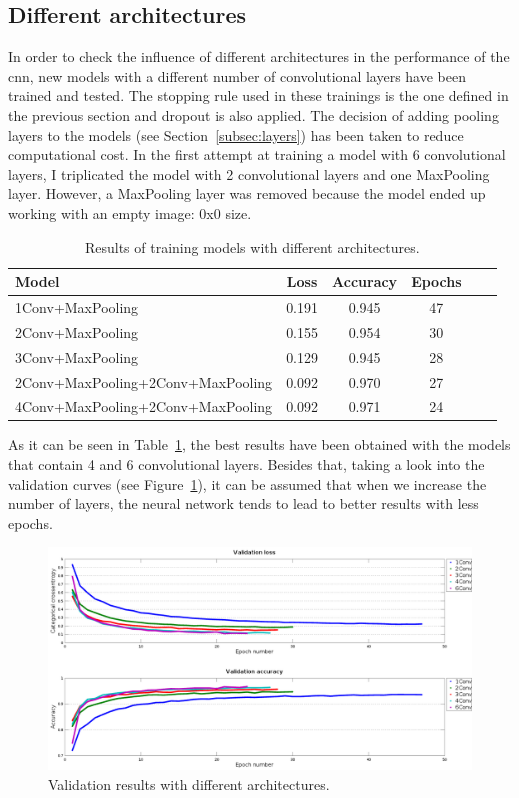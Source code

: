 \subsection{Different architectures}\label{subsec:arch}
In order to check the influence of different architectures in the performance of the \gls{cnn}, new models with a different number of convolutional layers have been trained and tested. The stopping rule used in these trainings is the one defined in the previous section and dropout is also applied. The decision of adding pooling layers to the models (see Section~\ref{subsec:layers}) has been taken to reduce computational cost. In the first attempt at training a model with 6 convolutional layers, I triplicated the model with 2 convolutional layers and one MaxPooling layer. However, a MaxPooling layer was removed because the model ended up working with an empty image: 0x0 size.
\begin{table}
	\centering
	\begin{tabular}{l*{4}{c}r}
		\textbf{Model} & \textbf{Loss} & \textbf{Accuracy} & \textbf{Epochs} \\
		\hline
		1Conv+MaxPooling & 0.191 & 0.945 & 47 \\
		2Conv+MaxPooling & 0.155 & 0.954 & 30 \\
		3Conv+MaxPooling & 0.129 & 0.945 & 28 \\
		2Conv+MaxPooling+2Conv+MaxPooling & 0.092 & 0.970 & 27 \\
		4Conv+MaxPooling+2Conv+MaxPooling & 0.092 & 0.971 & 24 \\
	\end{tabular}
	\caption{Results of training models with different architectures.}
	\label{tbl:arch}
\end{table}

As it can be seen in Table~\ref{tbl:arch}, the best results have been obtained with the models that contain 4 and 6 convolutional layers. Besides that, taking a look into the validation curves (see Figure~\ref{fig:comp_arch}), it can be assumed that when we increase the number of layers, the neural network tends to lead to better results with less epochs.

\begin{figure}
	\centering
	\includegraphics[width=1\linewidth, keepaspectratio]{figures/full_comparison.png}
	\caption{Validation results with different architectures.}
	\label{fig:comp_arch}
\end{figure}

